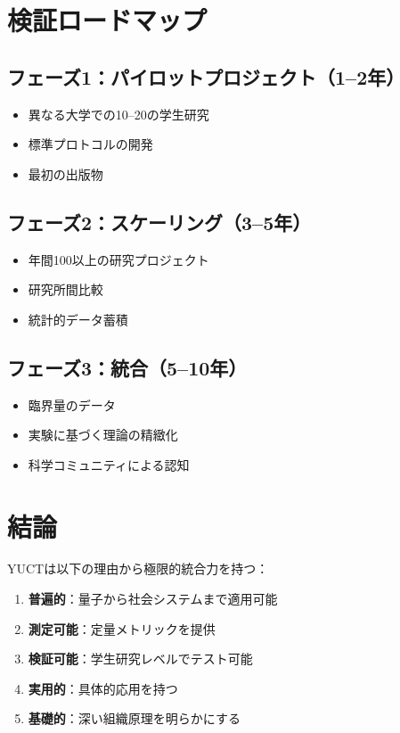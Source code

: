 \documentclass[12pt,a4paper]{article}
\begin{document}
	\section{検証ロードマップ}
	
	\subsection{フェーズ1：パイロットプロジェクト（1–2年）}
	\begin{itemize}
		\item 異なる大学での10–20の学生研究
		\item 標準プロトコルの開発
		\item 最初の出版物
	\end{itemize}
	
	\subsection{フェーズ2：スケーリング（3–5年）}
	\begin{itemize}
		\item 年間100以上の研究プロジェクト
		\item 研究所間比較
		\item 統計的データ蓄積
	\end{itemize}
	
	\subsection{フェーズ3：統合（5–10年）}
	\begin{itemize}
		\item 臨界量のデータ
		\item 実験に基づく理論の精緻化
		\item 科学コミュニティによる認知
	\end{itemize}
	
	\section{結論}
	
	YUCTは以下の理由から極限的統合力を持つ：
	\begin{enumerate}
		\item \textbf{普遍的}：量子から社会システムまで適用可能
		\item \textbf{測定可能}：定量メトリックを提供
		\item \textbf{検証可能}：学生研究レベルでテスト可能
		\item \textbf{実用的}：具体的応用を持つ
		\item \textbf{基礎的}：深い組織原理を明らかにする
	\end{enumerate}
	
\end{document}
